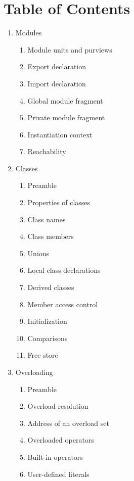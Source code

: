 \section{Table of Contents}
\begin{enumerate}%
\item Modules
    \begin{enumerate}[label=\arabic{enumi}.\arabic*., itemindent=!]
      \item Module units and purviews
      \item Export declaration 
      \item Import declaration 
      \item Global module fragment 
      \item Private module fragment 
      \item Instantiation context 
      \item Reachability
    \end{enumerate}
\item Classes
    \begin{enumerate}[label=\arabic{enumi}.\arabic*., leftmargin=*]
      \item Preamble   
      \item Properties of classes 
      \item Class names 
      \item Class members 
      \item Unions 
      \item Local class declarations
      \item Derived classes 
      \item Member access control 
      \item Initialization 
      \item Comparisons 
      \item Free store
    \end{enumerate}
\item Overloading
    \begin{enumerate}[label=\arabic{enumi}.\arabic*., leftmargin=*]
      \item Preamble 
      \item Overload resolution 
      \item Address of an overload set
      \item Overloaded operators 
      \item Built-in operators 
      \item User-defined literals
    \end{enumerate}

\end{enumerate}
